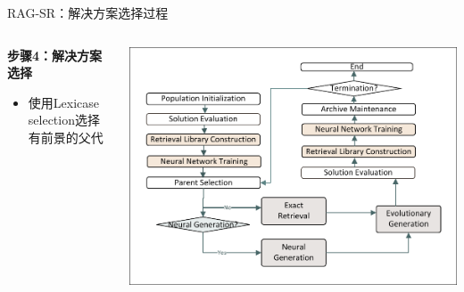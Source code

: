 \documentclass[aspectratio=1610]{beamer}
\begin{document}
    \begin{frame}{RAG-SR：解决方案选择过程}
        \begin{columns}
            \begin{column}{0.5\textwidth}
                \textbf{步骤4：解决方案选择}
                \begin{itemize}
                    \item 使用Lexicase selection选择有前景的父代
                \end{itemize}
            \end{column}
            \begin{column}{0.5\textwidth}
                \includegraphics[width=1.0\textwidth]{figs/Workflow.pdf}
            \end{column}
        \end{columns}
    \end{frame}
\end{document}
